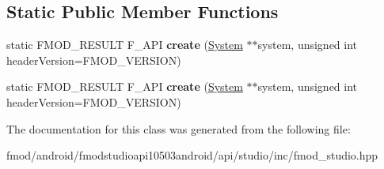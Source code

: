 \subsection*{Static Public Member Functions}
\begin{DoxyCompactItemize}
\item 
\hypertarget{class_f_m_o_d_1_1_studio_1_1_system_a3c03d1bdde56aad00db5610730f606ec}{static F\+M\+O\+D\+\_\+\+R\+E\+S\+U\+L\+T F\+\_\+\+A\+P\+I {\bfseries create} (\hyperlink{class_f_m_o_d_1_1_studio_1_1_system}{System} $\ast$$\ast$system, unsigned int header\+Version=F\+M\+O\+D\+\_\+\+V\+E\+R\+S\+I\+O\+N)}\label{class_f_m_o_d_1_1_studio_1_1_system_a3c03d1bdde56aad00db5610730f606ec}

\item 
\hypertarget{class_f_m_o_d_1_1_studio_1_1_system_a3c03d1bdde56aad00db5610730f606ec}{static F\+M\+O\+D\+\_\+\+R\+E\+S\+U\+L\+T F\+\_\+\+A\+P\+I {\bfseries create} (\hyperlink{class_f_m_o_d_1_1_studio_1_1_system}{System} $\ast$$\ast$system, unsigned int header\+Version=F\+M\+O\+D\+\_\+\+V\+E\+R\+S\+I\+O\+N)}\label{class_f_m_o_d_1_1_studio_1_1_system_a3c03d1bdde56aad00db5610730f606ec}

\end{DoxyCompactItemize}


The documentation for this class was generated from the following file\+:\begin{DoxyCompactItemize}
\item 
fmod/android/fmodstudioapi10503android/api/studio/inc/fmod\+\_\+studio.\+hpp\end{DoxyCompactItemize}
